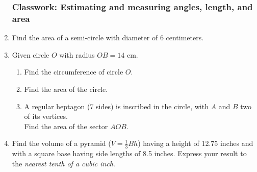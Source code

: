 \documentclass[12pt, twoside]{article}
\begin{document}
\begin{enumerate}
\newpage
\subsubsection*{Classwork: Estimating and measuring angles, length, and area} 
  \item Find the area of a semi-circle with diameter of 6 centimeters.
   \begin{flushright}
  \end{flushright}

  \item Given circle $O$ with radius $OB=14$ cm.
    \begin{multicols}{2}
    \raggedcolumns
    \begin{enumerate}
      \item Find the circumference of circle $O$. \vspace{1.7cm}
      \item Find the area of the circle.  \vspace{2cm}
      \item A regular heptagon (7 sides) is inscribed in the circle, with $A$ and $B$ two of its vertices. \\[0.25cm]
      Find the area of the sector $AOB$. \vspace{1.5cm}
    \end{enumerate}
    \end{multicols}  \vspace{3cm}

  \item Find the volume of a pyramid ($V=\frac{1}{3}Bh$) having a height of 12.75 inches and with a square base having side lengths of 8.5 inches. Express your result to the \emph{nearest tenth of a cubic inch}. \vspace{5cm}


\end{enumerate}
\end{document}
